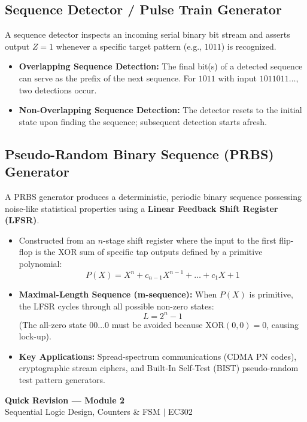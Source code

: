 \documentclass[12pt,a4paper]{article}
\begin{document}
\subsection{Sequence Detector / Pulse Train Generator}
A sequence detector inspects an incoming serial binary bit stream and asserts output $Z = 1$ whenever a specific target pattern (e.g., $1011$) is recognized.
\begin{itemize}[leftmargin=*, itemsep=3pt]
  \item \textbf{Overlapping Sequence Detection:} The final bit(s) of a detected sequence can serve as the prefix of the next sequence. For $1011$ with input $1011011 \dots$, two detections occur.
  \item \textbf{Non-Overlapping Sequence Detection:} The detector resets to the initial state upon finding the sequence; subsequent detection starts afresh.
\end{itemize}

\subsection{Pseudo-Random Binary Sequence (PRBS) Generator}
A PRBS generator produces a deterministic, periodic binary sequence possessing noise-like statistical properties using a \textbf{Linear Feedback Shift Register (LFSR)}.
\begin{itemize}[leftmargin=*, itemsep=3pt]
  \item Constructed from an $n$-stage shift register where the input to the first flip-flop is the XOR sum of specific tap outputs defined by a primitive polynomial:
  \begin{equation}
    P(X) = X^n + c_{n-1} X^{n-1} + \dots + c_1 X + 1
  \end{equation}
  \item \textbf{Maximal-Length Sequence (m-sequence):} When $P(X)$ is primitive, the LFSR cycles through all possible non-zero states:
  \begin{equation}
    L = 2^n - 1
  \end{equation}
  (The all-zero state $00 \dots 0$ must be avoided because $\text{XOR}(0,0) = 0$, causing lock-up).
  \item \textbf{Key Applications:} Spread-spectrum communications (CDMA PN codes), cryptographic stream ciphers, and Built-In Self-Test (BIST) pseudo-random test pattern generators.
\end{itemize}

\newpage
\begin{center}
  {\large\bfseries\color{myred} Quick Revision --- Module 2}\\[3pt]
  {\small\color{mydark} Sequential Logic Design, Counters \& FSM $|$ EC302}
\end{center}
\noindent{\color{myred}\rule{\linewidth}{1.2pt}}
\vspace{4pt}
\end{document}
